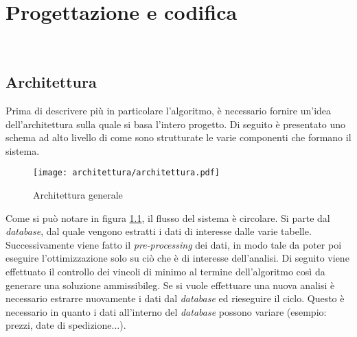 
\chapter{Progettazione e codifica}
\label{cap:progettazione-codifica}

\noindent {}\\

\section{Architettura}
\label{sec:progettazione}
\noindent Prima di descrivere più in particolare l'algoritmo, è necessario
fornire un’idea dell’architettura sulla quale si basa l'intero progetto.
Di seguito è presentato uno schema ad alto livello di come sono strutturate le varie
componenti che formano il sistema.

\begin{figure}[!h] 
    \centering 
    \texttt{[image: architettura/architettura.pdf]} 
    \caption{Architettura generale}
    \label{architettura-generale}
\end{figure}

\noindent Come si può notare in figura \ref{architettura-generale},
il flusso del sistema è circolare.
Si parte dal \textit{database}, dal quale vengono estratti i dati di interesse dalle varie
tabelle. Successivamente viene fatto il \textit{pre-processing} dei dati,
in modo tale da poter poi eseguire l'ottimizzazione solo su
ciò che è di interesse dell'analisi.
Di seguito viene effettuato il controllo dei vincoli di minimo al termine
dell'algoritmo così da generare
una soluzione \gls{ammissibileg}. Se si vuole effettuare una nuova
analisi è necessario estrarre nuovamente i dati dal
\textit{database} ed rieseguire il ciclo. Questo è necessario
in quanto i dati all'interno del \textit{database} possono variare
(esempio: prezzi, date di spedizione...).

\newpage


